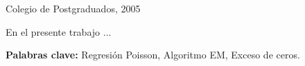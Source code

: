 \newpage
\thispagestyle{plain}
\begin{center}
  {\large \textbf{\eltitulo}}\\
  \vskip 0.5cm
  \elautor \\
  \vskip 0.5cm
  Colegio de Postgraduados, 2005\\
\end{center}

\vskip 0.5cm

\noindent En el presente trabajo ...

\vskip 0.5cm
\noindent \textbf{Palabras clave:} Regresión Poisson, Algoritmo EM, Exceso de ceros.


\endinput  
